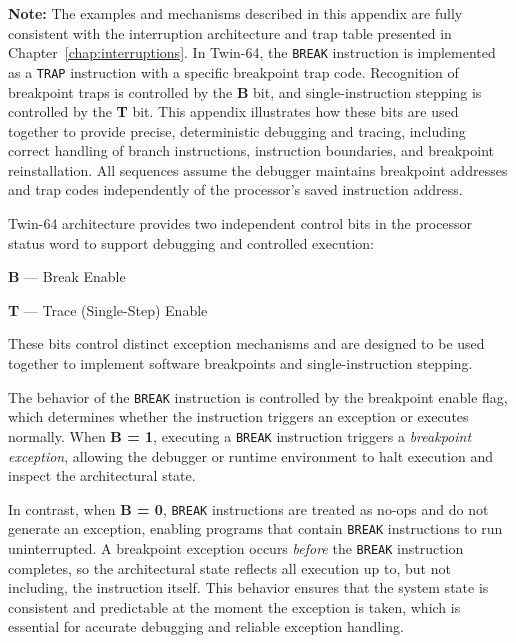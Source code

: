 
\noindent
\textbf{Note:} The examples and mechanisms described in this appendix are fully consistent with the interruption architecture and trap table presented in Chapter~\ref{chap:interruptions}. In Twin-64, the \texttt{BREAK} instruction is implemented as a \texttt{TRAP} instruction with a specific breakpoint trap code. Recognition of breakpoint traps is controlled by the \textbf{B} bit, and single-instruction stepping is controlled by the \textbf{T} bit. This appendix illustrates how these bits are used together to provide precise, deterministic debugging and tracing, including correct handling of branch instructions, instruction boundaries, and breakpoint reinstallation. All sequences assume the debugger maintains breakpoint addresses and trap codes independently of the processor’s saved instruction address.


Twin-64 architecture provides two independent control bits in the processor status
word to support debugging and controlled execution:

\begin{smallGapItemize}
  \item \textbf{B} --- Break Enable
  \item \textbf{T} --- Trace (Single-Step) Enable
\end{smallGapItemize}

These bits control distinct exception mechanisms and are designed to be used
together to implement software breakpoints and single-instruction stepping.


The behavior of the \texttt{BREAK} instruction is controlled by the breakpoint enable flag, which determines whether the instruction triggers an exception or executes normally. When \textbf{B = 1}, executing a \texttt{BREAK} instruction triggers a \emph{breakpoint exception}, allowing the debugger or runtime environment to halt execution and inspect the architectural state. 

In contrast, when \textbf{B = 0}, \texttt{BREAK} instructions are treated as no-ops and do not generate an exception, enabling programs that contain \texttt{BREAK} instructions to run uninterrupted. A breakpoint exception occurs \emph{before} the \texttt{BREAK} instruction completes, so the architectural state reflects all execution up to, but not including, the instruction itself. This behavior ensures that the system state is consistent and predictable at the moment the exception is taken, which is essential for accurate debugging and reliable exception handling.

